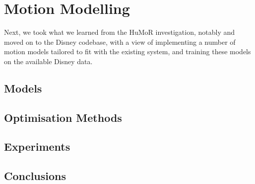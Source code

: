 \section{Motion Modelling}

Next, we took what we learned from the HuMoR investigation, notably  and moved on to the Disney codebase, with a view of implementing a number of motion models tailored to fit with the existing system, and training these models on the available Disney data.

\subsection{Models}


\subsection{Optimisation Methods}


\subsection{Experiments}


\subsection{Conclusions}